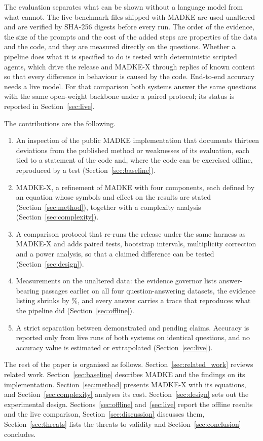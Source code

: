 The evaluation separates what can be shown without a language model from what cannot. The five benchmark files shipped with MADKE are used unaltered and are verified by SHA-256 digests before every run. The order of the evidence, the size of the prompts and the cost of the added steps are properties of the data and the code, and they are measured directly on the \VNQuestions{} questions. Whether a pipeline does what it is specified to do is tested with deterministic scripted agents, which drive the release and MADKE-X through replies of known content so that every difference in behaviour is caused by the code. End-to-end accuracy needs a live model. For that comparison both systems answer the same questions with the same open-weight backbone under a paired protocol; its status is reported in Section~\ref{sec:live}.

The contributions are the following.
\begin{enumerate}
\item An inspection of the public MADKE implementation that documents thirteen deviations from the published method or weaknesses of its evaluation, each tied to a statement of the code and, where the code can be exercised offline, reproduced by a test (Section~\ref{sec:baseline}).
\item MADKE-X, a refinement of MADKE with four components, each defined by an equation whose symbols and effect on the results are stated (Section~\ref{sec:method}), together with a complexity analysis (Section~\ref{sec:complexity}).
\item A comparison protocol that re-runs the release under the same harness as MADKE-X and adds paired tests, bootstrap intervals, multiplicity correction and a power analysis, so that a claimed difference can be tested (Section~\ref{sec:design}).
\item Measurements on the unaltered data: the evidence governor lists answer-bearing passages earlier on all four question-answering datasets, the evidence listing shrinks by \VTokRedMean\%, and every answer carries a trace that reproduces what the pipeline did (Section~\ref{sec:offline}).
\item A strict separation between demonstrated and pending claims. Accuracy is reported only from live runs of both systems on identical questions, and no accuracy value is estimated or extrapolated (Section~\ref{sec:live}).
\end{enumerate}

The rest of the paper is organised as follows. Section~\ref{sec:related_work} reviews related work. Section~\ref{sec:baseline} describes MADKE and the findings on its implementation. Section~\ref{sec:method} presents MADKE-X with its equations, and Section~\ref{sec:complexity} analyses its cost. Section~\ref{sec:design} sets out the experimental design. Sections~\ref{sec:offline} and~\ref{sec:live} report the offline results and the live comparison, Section~\ref{sec:discussion} discusses them, Section~\ref{sec:threats} lists the threats to validity and Section~\ref{sec:conclusion} concludes.
